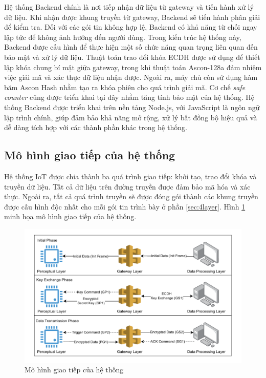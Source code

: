 Hệ thống Backend chính là nơi tiếp nhận dữ liệu từ gateway và tiến hành xử lý dữ liệu. Khi nhận được khung truyền từ gateway, Backend sẽ tiến hành phân giải để kiểm tra. Đối với các gói tin không hợp lệ, Backend có khả năng từ chối ngay lập tức để không ảnh hưởng đến người dùng. Trong kiến trúc hệ thống này, Backend được cấu hình để thực hiện một số chức năng quan trọng liên quan đến bảo mật và xử lý dữ liệu. Thuật toán trao đổi khóa ECDH được sử dụng để thiết lập khóa chung bí mật giữa gateway, trong khi thuật toán Ascon-128a đảm nhiệm việc giải mã và xác thực dữ liệu nhận được. Ngoài ra, máy chủ còn sử dụng hàm băm Ascon Hash nhằm tạo ra khóa phiên cho quá trình giải mã. Cơ chế \textit{safe counter} cũng được triển khai tại đây nhằm tăng tính bảo mật của hệ thống. Hệ thống Backend được triển khai trên nền tảng Node.js, với JavaScript là ngôn ngữ lập trình chính, giúp đảm bảo khả năng mở rộng, xử lý bất đồng bộ hiệu quả và dễ dàng tích hợp với các thành phần khác trong hệ thống.


\subsection{Mô hình giao tiếp của hệ thống}
\label{sec:tongquan}
Hệ thống IoT được chia thành ba quá trình giao tiếp: khởi tạo, trao đổi khóa và truyền dữ liệu. Tất cả dữ liệu trên đường truyền được đảm bảo mã hóa và xác thực. Ngoài ra, tất cả quá trình truyền sẽ được đóng gói thành các khung truyền được cấu hình độc nhất cho mỗi gói tin trình bày ở phần \ref{sec:4layer}. Hình \ref{fig:system} minh họa mô hình giao tiếp của hệ thống.

\begin{figure}[h]
    \centering
    \includegraphics[width=0.85\linewidth]{images/system.pdf}
    \caption{Mô hình giao tiếp của hệ thống}
    \label{fig:system}
\end{figure}

